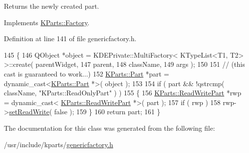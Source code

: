 \begin{DoxyReturn}{Returns}
the newly created part. 
\end{DoxyReturn}


Implements \hyperlink{classKParts_1_1Factory_a05e336b747b65776e31db466736570f2}{K\+Parts\+::\+Factory}.



Definition at line 141 of file genericfactory.\+h.


\begin{DoxyCode}
145         \{
146             QObject *\textcolor{keywordtype}{object} = KDEPrivate::MultiFactory< KTypeList<T1, T2> >::create( parentWidget,
147                                                                                      parent,
148                                                                                      className,
149                                                                                      args );
150 
151             \textcolor{comment}{// (this cast is guaranteed to work...)}
152             \hyperlink{classKParts_1_1Part}{KParts::Part} *part = \textcolor{keyword}{dynamic\_cast<}\hyperlink{classKParts_1_1Part}{KParts::Part} *\textcolor{keyword}{>}( object );
153 
154             \textcolor{keywordflow}{if} ( part && !qstrcmp( className, \textcolor{stringliteral}{"KParts::ReadOnlyPart"} ) )
155             \{
156                 \hyperlink{classKParts_1_1ReadWritePart}{KParts::ReadWritePart} *rwp = \textcolor{keyword}{dynamic\_cast<}
      \hyperlink{classKParts_1_1ReadWritePart}{KParts::ReadWritePart} *\textcolor{keyword}{>}( part );
157                 \textcolor{keywordflow}{if} ( rwp )
158                     rwp->\hyperlink{classKParts_1_1ReadWritePart_a5b8c2d4b35739c882dc67f0acf8096c2}{setReadWrite}( \textcolor{keyword}{false} );
159             \}
160             \textcolor{keywordflow}{return} part;
161         \}
\end{DoxyCode}


The documentation for this class was generated from the following file\+:\begin{DoxyCompactItemize}
\item 
/usr/include/kparts/\hyperlink{genericfactory_8h}{genericfactory.\+h}\end{DoxyCompactItemize}
